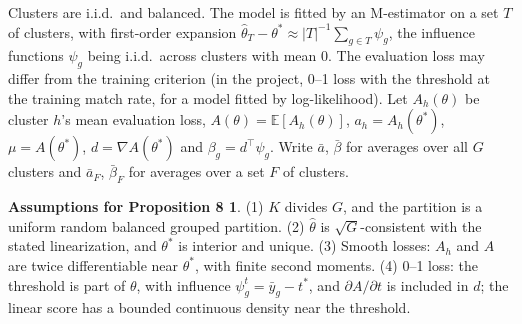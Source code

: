 \documentclass[11pt]{amsart}
\theoremstyle{plain}
\theoremstyle{definition}
\newtheorem*{assump}{Assumptions for Proposition 8}
\theoremstyle{remark}
\newcommand{\E}{\mathbb{E}}
\begin{document}
Clusters are i.i.d.\ and balanced. The model is fitted by an M-estimator on a set $T$ of clusters, with first-order expansion $\hat\theta_T-\theta^*\approx|T|^{-1}\sum_{g\in T}\psi_g$, the influence functions $\psi_g$ being i.i.d.\ across clusters with mean $0$. The evaluation loss may differ from the training criterion (in the project, 0--1 loss with the threshold at the training match rate, for a model fitted by log-likelihood). Let $A_h(\theta)$ be cluster $h$'s mean evaluation loss, $A(\theta)=\E[A_h(\theta)]$, $a_h=A_h(\theta^*)$, $\mu=A(\theta^*)$, $d=\nabla A(\theta^*)$ and $\beta_g=d^\top\psi_g$. Write $\bar a$, $\bar\beta$ for averages over all $G$ clusters and $\bar a_F$, $\bar\beta_F$ for averages over a set $F$ of clusters.

\begin{assump}
(1) $K$ divides $G$, and the partition is a uniform random balanced grouped partition. (2) $\hat\theta$ is $\sqrt G$-consistent with the stated linearization, and $\theta^*$ is interior and unique. (3) Smooth losses: $A_h$ and $A$ are twice differentiable near $\theta^*$, with finite second moments. (4) 0--1 loss: the threshold is part of $\theta$, with influence $\psi^t_g=\bar y_g-t^*$, and $\partial A/\partial t$ is included in $d$; the linear score has a bounded continuous density near the threshold.
\end{assump}
\end{document}

